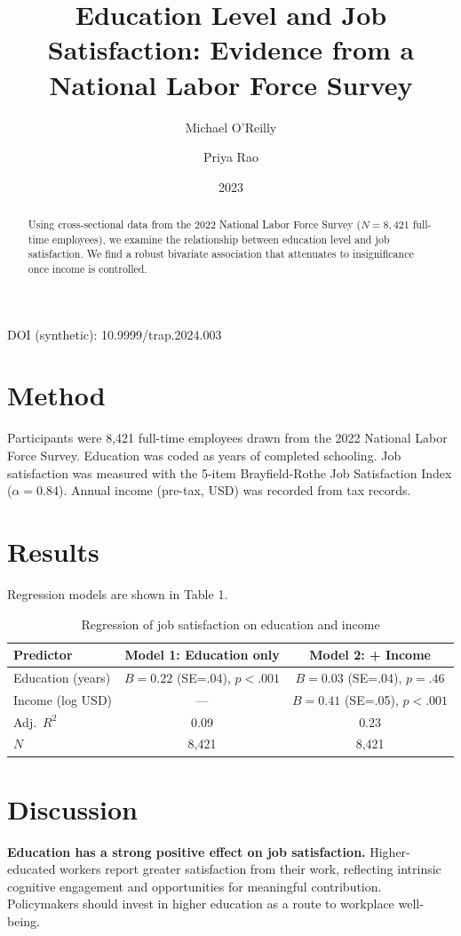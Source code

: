 \documentclass[11pt]{article}
\title{Education Level and Job Satisfaction: Evidence from a National Labor Force Survey}
\author{Michael O'Reilly \and Priya Rao}
\date{2023}
\begin{document}
\maketitle
\noindent DOI (synthetic): 10.9999/trap.2024.003

\begin{abstract}
Using cross-sectional data from the 2022 National Labor Force Survey ($N = 8,421$ full-time employees), we examine the relationship between education level and job satisfaction. We find a robust bivariate association that attenuates to insignificance once income is controlled.
\end{abstract}

\section{Method}
Participants were 8,421 full-time employees drawn from the 2022 National Labor Force Survey. Education was coded as years of completed schooling. Job satisfaction was measured with the 5-item Brayfield-Rothe Job Satisfaction Index ($\alpha = 0.84$). Annual income (pre-tax, USD) was recorded from tax records.

\section{Results}
Regression models are shown in Table 1.

\begin{table}[h]
\centering
\caption{Regression of job satisfaction on education and income}
\begin{tabular}{lcc}
\toprule
Predictor & Model 1: Education only & Model 2: + Income \\
\midrule
Education (years) & $B = 0.22$ (SE=.04), $p < .001$ & $B = 0.03$ (SE=.04), $p = .46$ \\
Income (log USD) & --- & $B = 0.41$ (SE=.05), $p < .001$ \\
\midrule
Adj.\ $R^2$ & 0.09 & 0.23 \\
$N$ & 8{,}421 & 8{,}421 \\
\bottomrule
\end{tabular}
\end{table}

\section{Discussion}
\textbf{Education has a strong positive effect on job satisfaction.} Higher-educated workers report greater satisfaction from their work, reflecting intrinsic cognitive engagement and opportunities for meaningful contribution. Policymakers should invest in higher education as a route to workplace well-being.
\end{document}
